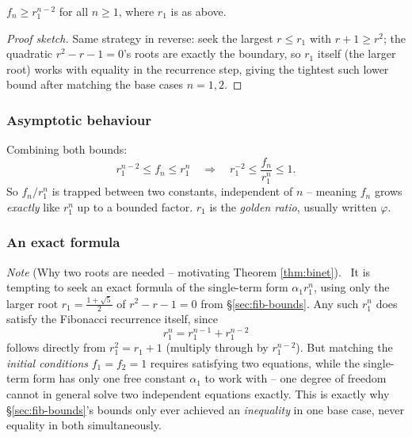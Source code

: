 \documentclass[11pt]{article}
\begin{document}
\begin{theorem}
$f_n \ge r_1^{n-2}$ for all $n\ge1$, where $r_1$ is as above.
\end{theorem}
\begin{proof}[Proof sketch]
Same strategy in reverse: seek the largest $r\le r_1$ with $r+1\ge r^2$; the quadratic $r^2-r-1=0$'s roots are exactly the boundary, so $r_1$ itself (the larger root) works with equality in the recurrence step, giving the tightest such lower bound after matching the base cases $n=1,2$.
\end{proof}

\subsubsection{Asymptotic behaviour}
\label{sec:6-7-3}

\begin{note}
Combining both bounds:
\[
r_1^{n-2} \le f_n \le r_1^n \quad\Longrightarrow\quad r_1^{-2} \le \frac{f_n}{r_1^n} \le 1.
\]
So $f_n/r_1^n$ is trapped between two constants, independent of $n$ -- meaning $f_n$ grows \emph{exactly} like $r_1^n$ up to a bounded factor. $r_1$ is the \emph{golden ratio}, usually written $\varphi$.
\end{note}

\subsubsection{An exact formula}
\label{sec:6-7-4}

\textit{Note} (Why two roots are needed -- motivating Theorem \ref{thm:binet}). \ It is tempting to seek an exact formula of the single-term form $\alpha_1r_1^n$, using only the larger root $r_1=\frac{1+\sqrt5}{2}$ of $r^2-r-1=0$ from \S\ref{sec:fib-bounds}. Any such $r_1^n$ does satisfy the Fibonacci recurrence itself, since
\[
r_1^n=r_1^{n-1}+r_1^{n-2}
\]
follows directly from $r_1^2=r_1+1$ (multiply through by $r_1^{n-2}$). But matching the \emph{initial conditions} $f_1=f_2=1$ requires satisfying two equations, while the single-term form has only one free constant $\alpha_1$ to work with -- one degree of freedom cannot in general solve two independent equations exactly. This is exactly why \S\ref{sec:fib-bounds}'s bounds only ever achieved an \emph{inequality} in one base case, never equality in both simultaneously.
\end{document}
